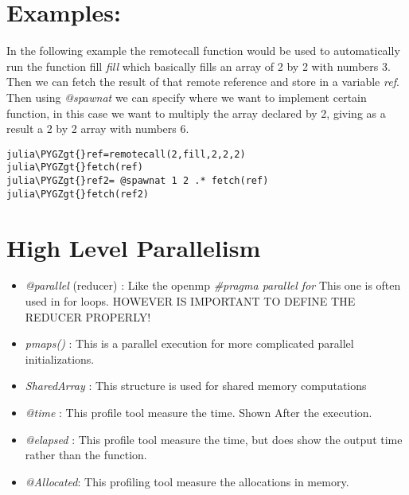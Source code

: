 \documentclass[letterpaper,10pt,english]{sphinxmanual}
\def\PYGZgt{\char`\>}
\begin{document}
\section{Examples:}
\label{JuliaPar:examples}
In the following example the remotecall function would be used to automatically run the function fill \emph{fill} which basically fills an array of 2 by 2 with numbers 3. Then we can fetch the result of that remote reference and store in a variable \emph{ref}. Then using \emph{@spawnat} we can specify where we want to implement certain function, in this case we want to multiply the array declared by 2, giving as a result a 2 by 2 array with numbers 6.

\begin{Verbatim}[commandchars=\\\{\}]
julia\PYGZgt{}ref=remotecall(2,fill,2,2,2)
julia\PYGZgt{}fetch(ref)
julia\PYGZgt{}ref2= @spawnat 1 2 .* fetch(ref)
julia\PYGZgt{}fetch(ref2)
\end{Verbatim}




\section{High Level Parallelism}
\label{JuliaPar:high-level-parallelism}\begin{itemize}
\item {} 
\emph{@parallel} (reducer) : Like the openmp \emph{\#pragma parallel for}
This one is often used in for loops.  HOWEVER IS IMPORTANT TO DEFINE THE REDUCER PROPERLY!

\item {} 
\emph{pmaps()} : This is a parallel execution for more complicated parallel initializations.

\item {} 
\emph{SharedArray} : This structure is used for shared memory computations

\item {} 
\emph{@time} : This profile tool measure the time. Shown After the execution.

\item {} 
\emph{@elapsed} : This profile tool measure the time, but does show the output  time rather than the function.

\item {} 
\emph{@Allocated}: This profiling tool measure the allocations in memory.

\end{itemize}
\end{document}
